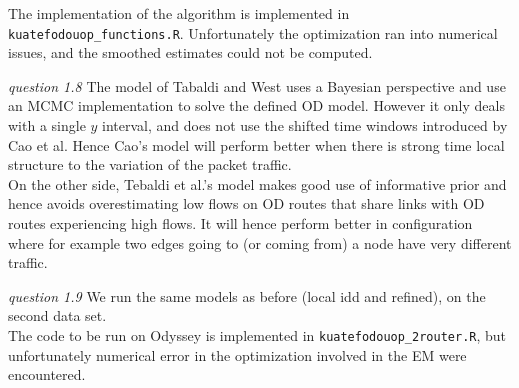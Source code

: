 \documentclass[twoside]{article}
\begin{document}
The implementation of the algorithm is implemented in \texttt{kuatefodouop\_functions.R}. Unfortunately the optimization ran into numerical issues, and the smoothed estimates could not be computed.

\vspace{.2 in}
\textit{question 1.8} The model of Tabaldi and West uses a Bayesian perspective and use an MCMC implementation to solve the defined OD model. However it only deals with a single $y$ interval, and does not use the shifted time windows introduced by Cao et al. Hence Cao's model will perform better when there is strong time local structure to the variation of the packet traffic.\\

On the other side, Tebaldi et al.'s model makes good use of informative prior and hence avoids overestimating low flows on OD routes that share links with OD routes experiencing high flows. It will hence perform better in configuration where for example two edges going to (or coming from) a node have very different traffic.

\vspace{.2 in}
\textit{question 1.9} We run the same models as before (local idd and refined), on the second data set.\\

The code to be run on Odyssey is implemented in \texttt{kuatefodouop\_2router.R}, but unfortunately numerical error in the optimization involved in the EM were encountered.

\end{document}
